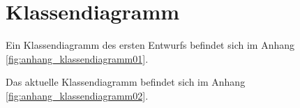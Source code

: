 \section{Klassendiagramm}
\label{sec:Klassendiagramm}
\multipleauthorsection{\authorSG}{\authorNL}

Ein Klassendiagramm des ersten Entwurfs befindet sich im Anhang \vref{fig:anhang_klassendiagramm01}.

Das aktuelle Klassendiagramm befindet sich im Anhang \vref{fig:anhang_klassendiagramm02}.
